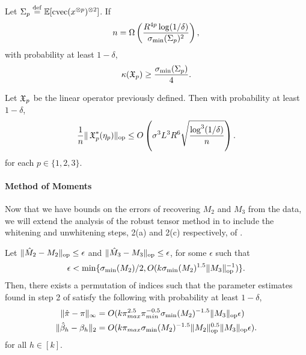 
\begin{lemma}
\label{lem:lowRankLower}
Let $\Sigma_p \stackrel{\rm def}{=} \operatorname{\mathbb{E}}[\operatorname{cvec}(x^{\otimes p})^{\otimes 2}]$.
If $$n = \Omega \left( \frac{R^{4p} \log(1/\delta)}{\sigma_\text{\rm min}(\Sigma_p)^2} \right),$$
with probability at least $1-\delta$,
$$\kappa(\operatorname{\mathfrak{X}}_p) \ge \frac{\sigma_\text{\rm min}(\Sigma_p)}{4}.$$
\end{lemma}


\begin{lemma}
\label{lem:lowRankUpper}
Let $\operatorname{\mathfrak{X}}_p$ be the linear operator previously defined. Then with
probability at least $1-\delta$,
$$\frac1{n} \|\operatorname{\mathfrak{X}}_p^*(\eta_p)\|_{\text{\rm op}} \le O\left(\sigma^3 L^3 R^6 \sqrt{\frac{\log^3(1/\delta)}{n}}\right).$$
for each $p \in \{1,2,3\}$.
\end{lemma}

\paragraph{Method of Moments} 

Now that we have bounds on the errors of recovering $M_2$ and $M_3$ from
the data, we will extend the analysis of the robust tensor method in
\citet{AnandkumarGeHsu2012} to include the whitening and unwhitening
steps, 2(a) and 2(c) respectively, of
.
\begin{lemma}
  \label{lem:tensorPower} Let $\|\hat M_2 - M_2\|_{\text{op}} \le \epsilon$ and
  $\|\hat M_3 - M_3\|_{\text{op}} \le \epsilon$, for some $\epsilon$ such that 
  $$\epsilon < \min\{\sigma_\text{\rm min}(M_2)/2,O(k \sigma_\text{\rm min}(M_2)^{1.5} \|M_3\|_{\text{op}}^{-1})\}.$$ 
  Then, there exists a permutation of indices such that  the parameter
  estimates found in step 2 of 
  satisfy the following with probability at least $1 - \delta$,
  \begin{align*}
  \|\hat \pi - \pi \|_{\infty}
    &= O( k \pi_{max}^{2.5} \pi_{min}^{-0.5} \sigma_\text{\rm min}(M_2)^{-1.5} \|M_3\|_{\text{op}} \epsilon ) \\
  \|\hat \beta_h - \beta_h\|_2
    &= O( k \pi_{max} \sigma_\text{\rm min}(M_2)^{-1.5} \|M_2\|_{\text{op}}^{0.5} \|M_3\|_{\text{op}} \epsilon ).
  \end{align*}
  for all $h \in [k]$.
\end{lemma}

